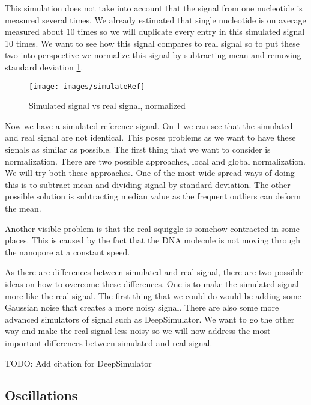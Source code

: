 This simulation does not take into account that the signal from one nucleotide is
measured several times. We already estimated that single nucleotide is on average
measured about 10 times so we will duplicate every entry in this simulated signal
10 times. We want to see how this signal compares to real signal so to put these
two into perspective we normalize this signal by subtracting mean and removing
standard deviation \ref{obr:simVsReal}.

\begin{figure}
\centerline{\texttt{[image: images/simulateRef]}}
\caption[Hehe]{Simulated signal vs real signal, normalized}
\label{obr:simVsReal}
\end{figure}

Now we have a simulated reference signal. On \ref{obr:simVsReal} we can see that the simulated and real
signal are not identical. This poses problems as we want to have these signals as
similar as possible. The first thing that we want to consider is normalization. There
are two possible approaches, local and global normalization. We will try both these
approaches. One of the most wide-spread ways of doing this is to subtract mean and dividing
signal by standard deviation. The other possible solution is subtracting median value
as the frequent outliers can deform the mean.

Another visible problem is that the real squiggle is somehow contracted
in some places. This is caused by the fact that the DNA molecule is not moving
through the nanopore at a constant speed.

As there are differences between simulated and real signal, there are two possible
ideas on how to overcome these differences. One is to make the simulated signal more like
the real signal. The first thing that we could do would be adding some Gaussian noise
that creates a more noisy signal. There are also some more advanced simulators of
signal such as DeepSimulator. We want to go the other way and make the real signal
less noisy so we will now address the most important differences between simulated and real signal.

TODO: Add citation for DeepSimulator

\subsection{Oscillations}

